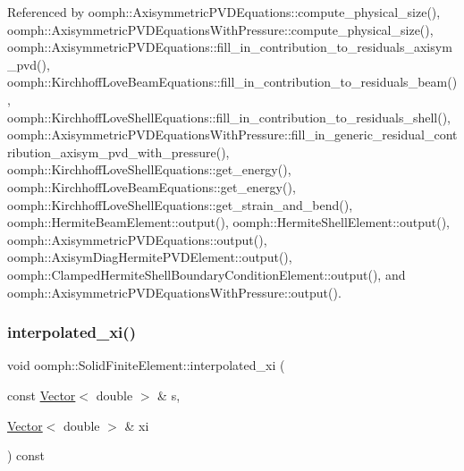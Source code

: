 Referenced by oomph\+::\+Axisymmetric\+P\+V\+D\+Equations\+::compute\+\_\+physical\+\_\+size(), oomph\+::\+Axisymmetric\+P\+V\+D\+Equations\+With\+Pressure\+::compute\+\_\+physical\+\_\+size(), oomph\+::\+Axisymmetric\+P\+V\+D\+Equations\+::fill\+\_\+in\+\_\+contribution\+\_\+to\+\_\+residuals\+\_\+axisym\+\_\+pvd(), oomph\+::\+Kirchhoff\+Love\+Beam\+Equations\+::fill\+\_\+in\+\_\+contribution\+\_\+to\+\_\+residuals\+\_\+beam(), oomph\+::\+Kirchhoff\+Love\+Shell\+Equations\+::fill\+\_\+in\+\_\+contribution\+\_\+to\+\_\+residuals\+\_\+shell(), oomph\+::\+Axisymmetric\+P\+V\+D\+Equations\+With\+Pressure\+::fill\+\_\+in\+\_\+generic\+\_\+residual\+\_\+contribution\+\_\+axisym\+\_\+pvd\+\_\+with\+\_\+pressure(), oomph\+::\+Kirchhoff\+Love\+Shell\+Equations\+::get\+\_\+energy(), oomph\+::\+Kirchhoff\+Love\+Beam\+Equations\+::get\+\_\+energy(), oomph\+::\+Kirchhoff\+Love\+Shell\+Equations\+::get\+\_\+strain\+\_\+and\+\_\+bend(), oomph\+::\+Hermite\+Beam\+Element\+::output(), oomph\+::\+Hermite\+Shell\+Element\+::output(), oomph\+::\+Axisymmetric\+P\+V\+D\+Equations\+::output(), oomph\+::\+Axisym\+Diag\+Hermite\+P\+V\+D\+Element\+::output(), oomph\+::\+Clamped\+Hermite\+Shell\+Boundary\+Condition\+Element\+::output(), and oomph\+::\+Axisymmetric\+P\+V\+D\+Equations\+With\+Pressure\+::output().

\mbox{\label{classoomph_1_1SolidFiniteElement_ae7a83078da76450db70b82b97f70bc2d}} 
\subsubsection{\texorpdfstring{interpolated\+\_\+xi()}{interpolated\_xi()}\hspace{0.1cm}{\footnotesize\ttfamily [2/2]}}
{\footnotesize\ttfamily void oomph\+::\+Solid\+Finite\+Element\+::interpolated\+\_\+xi (\begin{DoxyParamCaption}\item[{const \hyperlink{classoomph_1_1Vector}{Vector}$<$ double $>$ \&}]{s,  }\item[{\hyperlink{classoomph_1_1Vector}{Vector}$<$ double $>$ \&}]{xi }\end{DoxyParamCaption}) const\hspace{0.3cm}{\ttfamily [virtual]}}



